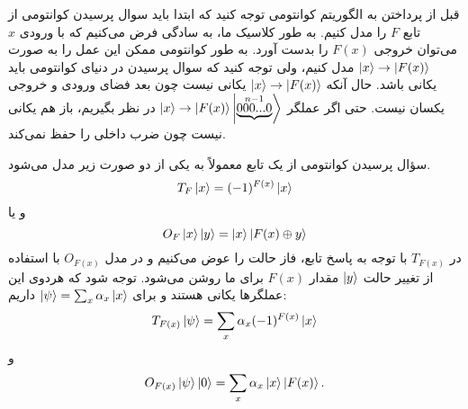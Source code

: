 قبل از پرداختن به الگوریتم کوانتومی توجه کنید که ابتدا باید سوال پرسیدن کوانتومی از تابع $F$ را مدل کنیم. به طور کلاسیک ما، به سادگی فرض می‌کنیم که با ورودی $x$ می‌توان خروجی $F(x)$ را بدست آورد. به طور کوانتومی ممکن این عمل را به صورت  $\ket{x} \to \ket{F(x)}$ مدل کنیم، ولی توجه کنید که سوال پرسیدن در دنیای  کوانتومی باید یکانی باشد. حال آنکه $\ket{x} \to \ket{F(x)}$ یکانی نیست چون بعد فضای ورودی و خروجی یکسان نیست. حتی اگر عملگر 
$\ket{x} \to \ket{F(x)}\ket{\underbrace{000...0}^{n-1}}$  در نظر بگیریم، باز هم یکانی نیست چون ضرب داخلی را حفظ نمی‌کند.

 سؤال پرسیدن کوانتومی از یک تابع معمولاً به یکی از دو صورت زیر مدل می‌شود. 
 \begin{equation}
 	T_{F}\ket{x} = (-1)^{F(x)}\ket{x}
 \end{equation}
  و یا 
  \begin{equation}
  	O_{F}\ket{x}\ket{y} = \ket{x}\ket{F(x)\oplus y}
  \end{equation}
  در $T_{F(x)}$ با توجه به پاسخ تابع، فاز حالت را عوض می‌کنیم و در مدل $O_{F(x)}$ با استفاده از تغییر حالت $\ket{y}$ مقدار $F(x)$ برای ما روشن می‌شود. توجه شود که هردوی این عملگرها یکانی هستند و برای 
  $\ket{\psi} = \sum_{x}\alpha_{x}\ket{x}$ داریم:
  \begin{equation}
  	T_{F(x)}\ket{\psi} = \sum_{x}\alpha_{x}(-1)^{F(x)}\ket{x}
  \end{equation}
  و 
  \begin{equation}
  	O_{F(x)}\ket{\psi}\ket{0} = \sum_{x}\alpha_{x}\ket{x}\ket{F(x)}.
  \end{equation}
